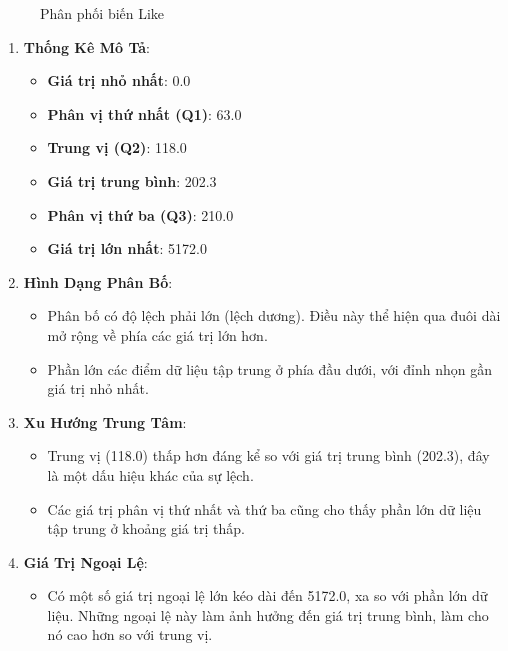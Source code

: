 \begin{itemize}
\begin{itemize}
\begin{figure}[H]
        \caption{Phân phối biến Like}
        \label{fig:Phân phối biến Like}
    \end{figure}
        \begin{enumerate}
            \item \textbf{Thống Kê Mô Tả}:
            \begin{itemize}
                \item \textbf{Giá trị nhỏ nhất}: 0.0
                \item \textbf{Phân vị thứ nhất (Q1)}: 63.0
                \item \textbf{Trung vị (Q2)}: 118.0
                \item \textbf{Giá trị trung bình}: 202.3
                \item \textbf{Phân vị thứ ba (Q3)}: 210.0
                \item \textbf{Giá trị lớn nhất}: 5172.0
            \end{itemize}
        
            \item \textbf{Hình Dạng Phân Bố}:
            \begin{itemize}
                \item Phân bố có độ lệch phải lớn (lệch dương). Điều này thể hiện qua đuôi dài mở rộng về phía các giá trị lớn hơn.
                \item Phần lớn các điểm dữ liệu tập trung ở phía đầu dưới, với đỉnh nhọn gần giá trị nhỏ nhất.
            \end{itemize}
        
            \item \textbf{Xu Hướng Trung Tâm}:
            \begin{itemize}
                \item Trung vị (118.0) thấp hơn đáng kể so với giá trị trung bình (202.3), đây là một dấu hiệu khác của sự lệch.
                \item Các giá trị phân vị thứ nhất và thứ ba cũng cho thấy phần lớn dữ liệu tập trung ở khoảng giá trị thấp.
            \end{itemize}
        
            \item \textbf{Giá Trị Ngoại Lệ}:
            \begin{itemize}
                \item Có một số giá trị ngoại lệ lớn kéo dài đến 5172.0, xa so với phần lớn dữ liệu. Những ngoại lệ này làm ảnh hưởng đến giá trị trung bình, làm cho nó cao hơn so với trung vị.
            \end{itemize}
        

\end{enumerate}
\end{itemize}
\end{itemize}
